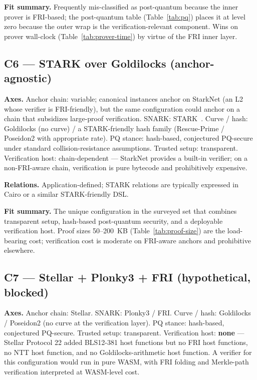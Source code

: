 \textbf{Fit summary.} Frequently mis-classified as post-quantum
because the inner prover is FRI-based; the post-quantum table
(Table~\ref{tab:pq}) places it at level zero because the outer wrap
is the verification-relevant component. Wins on prover wall-clock
(Table~\ref{tab:prover-time}) by virtue of the FRI inner layer.

\subsection{C6 --- STARK over Goldilocks (anchor-agnostic)}
\label{sec:cfg-c6}

\textbf{Axes.} Anchor chain: variable; canonical instances anchor on
StarkNet (an L2 whose verifier is FRI-friendly), but the same
configuration could anchor on a chain that subsidizes large-proof
verification. SNARK: STARK~\cite{ben-sasson-2018-stark}.
Curve / hash: Goldilocks (no curve) / a STARK-friendly hash family
(Rescue-Prime / Poseidon2 with appropriate rate). PQ stance:
hash-based, conjectured PQ-secure under standard collision-resistance
assumptions. Trusted setup: transparent. Verification host:
chain-dependent --- StarkNet provides a built-in verifier; on a
non-FRI-aware chain, verification is pure bytecode and prohibitively
expensive.

\textbf{Relations.} Application-defined; STARK relations are
typically expressed in Cairo or a similar STARK-friendly DSL.

\textbf{Fit summary.} The unique configuration in the surveyed set
that combines transparent setup, hash-based post-quantum security,
and a deployable verification host. Proof sizes 50--200~KB
(Table~\ref{tab:proof-size}) are the load-bearing cost; verification
cost is moderate on FRI-aware anchors and prohibitive elsewhere.

\subsection{C7 --- Stellar + Plonky3 + FRI (hypothetical, blocked)}
\label{sec:cfg-c7}

\textbf{Axes.} Anchor chain: Stellar. SNARK: Plonky3 / FRI. Curve / hash:
Goldilocks / Poseidon2 (no curve at the verification layer). PQ
stance: hash-based, conjectured PQ-secure. Trusted setup: transparent.
Verification host: \textbf{none} --- Stellar Protocol 22 added
BLS12-381 host functions but no FRI host functions, no
NTT host function, and no Goldilocks-arithmetic host function. A
verifier for this configuration would run in pure WASM, with FRI
folding and Merkle-path verification interpreted at WASM-level cost.

